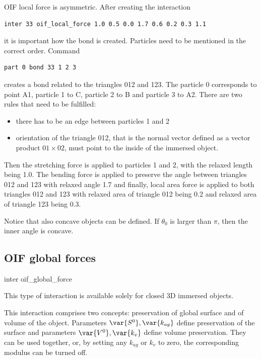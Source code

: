 OIF local force is asymmetric. After creating the interaction
\begin{verbatim} 
inter 33 oif_local_force 1.0 0.5 0.0 1.7 0.6 0.2 0.3 1.1
\end{verbatim}
it is important how the bond is created. Particles need to be mentioned in the 
correct order. Command
\begin{verbatim} 
part 0 bond 33 1 2 3
\end{verbatim}
creates a bond related to the triangles 012 and 123. The particle 
0 corresponds to point A1, particle 1 to C, particle 2 to B and particle 3 to A2. 
There are two rules that need to be fulfilled:
\begin{itemize}
\item there has to be an edge between particles 1 and 2
\item orientation of the triangle 012, that is the normal vector 
defined as a vector product $01 \times 02$, must point to the inside of the immersed 
object.
\end{itemize}
Then the stretching force is applied to particles 1 and 2, with the relaxed length being 1.0. The bending force is applied to preserve the angle between triangles 012 and 123 with relaxed angle 1.7 and finally, local area force is applied to both triangles 012 and 123 with relaxed area of triangle 012 being 0.2 and relaxed area of triangle 123 being 0.3.
 
Notice that also concave objects can be defined. If $\theta_0$ is larger than $\pi$, 
then the inner angle is concave.


\subsection{OIF global forces}

\begin{essyntax}
  inter 
  oif_global_force
       
   \begin{features}
  \end{features}
\end{essyntax}
This type of interaction is available solely for closed 3D immersed objects.

This interaction comprises two concepts: preservation of global surface and of volume of the object. Parameters $\var{S^0}, \var{k_{ag}}$ define preservation of the surface and parameters $  \var{V^0}, \var{k_{v}}$ define volume preservation. They can be used together, or, by setting any $k_{ag}$ or $k_{v}$ to zero, the corresponding modulus can be turned off.

